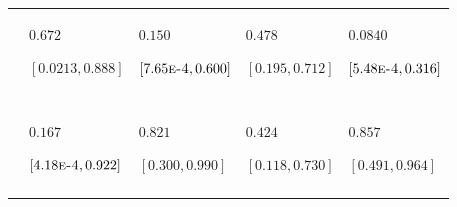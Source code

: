 \begin{tabular}{>{\raggedleft\arraybackslash}m{1cm}>{\centering\arraybackslash}m{2.3cm}>{\centering\arraybackslash}m{2.3cm}>{\centering\arraybackslash}m{2.3cm}>{\centering\arraybackslash}m{2.3cm}}
\hspace{1em}\cellcolor{blue!5!white!90!black}{$\gamma_{L_{\infty}}$} & $0.672$\par\scriptsize $[0.0213,0.888]$ & $0.150$\par\scriptsize $[7.65\text{\textsc{e-4}},0.600]$ & $0.478$\par\scriptsize $[0.195,0.712]$ & $0.0840$\par\scriptsize $[5.48\text{\textsc{e-4}},0.316]$\\
\addlinespace[0.3em]
\multicolumn{5}{l}{\cellcolor{blue!5!white!90!black}{\textbf{$\iota$-decomposition}}}\\
\hspace{1em}\cellcolor{blue!5!white!90!black}{$\iota_{L_{0}}$} & \cellcolor{gray}{$0.0157$\par\scriptsize $[0.00665,0.149]$} & \cellcolor{gray}{$0.00780$\par\scriptsize $[0.00360,0.0243]$} & \cellcolor{gray}{$0.0413$\par\scriptsize $[0.0233,0.0806]$} & \cellcolor{gray}{$0.0520$\par\scriptsize $[0.0230,0.134]$}\\
\hspace{1em}\cellcolor{blue!5!white!90!black}{$\iota_{k}$} & $0.167$\par\scriptsize $[4.18\text{\textsc{e-4}},0.922]$ & $0.821$\par\scriptsize $[0.300,0.990]$ & $0.424$\par\scriptsize $[0.118,0.730]$ & $0.857$\par\scriptsize $[0.491,0.964]$\\
\hspace{1em}\cellcolor{blue!5!white!90!black}{$\iota_{L_{\infty}}$} & \cellcolor{gray}{$0.810$\par\scriptsize $[0.0349,0.985]$} & \cellcolor{gray}{$0.170$\par\scriptsize $[8.75\text{\textsc{e-4}},0.686]$} & \cellcolor{gray}{$0.532$\par\scriptsize $[0.227,0.829]$} & \cellcolor{gray}{$0.0923$\par\scriptsize $[5.73\text{\textsc{e-4}},0.410]$}\\
\bottomrule
\end{tabular}
